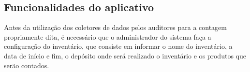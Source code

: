 \subsection{Funcionalidades do aplicativo}

Antes da utilização dos coletores de dados pelos auditores para a contagem propriamente dita, é necessário que o administrador do sistema faça a configuração do inventário, que consiste em informar o nome do inventário, a data de início e fim, o depósito onde será realizado o inventário e os produtos que serão contados. 

\begin{figure}[t]
    \centering
    \quad
    \quad
    \quad
\end{figure}
